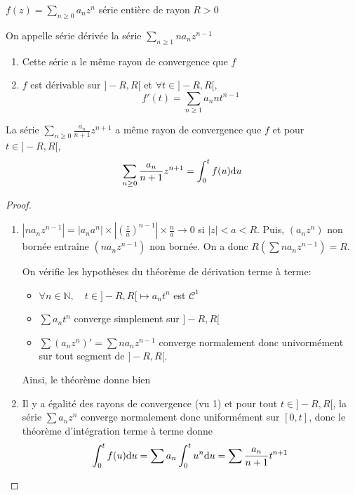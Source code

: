 \begin{thm}
    \Hyp $f(z)=\sum_{n\geq 0}a_nz^n$ série entière de rayon $R>0$
    \begin{concenum}
    \item On appelle série dérivée la série $\sum_{n\geq 1}na_nz^{n-1}$
        \begin{enumerate}
            \item Cette série a le même rayon de convergence que $f$
            \item $f$ est dérivable sur $]-R, R[$ et $\forall t\in ]-R, R[,$ \[
                    f'(t)=\sum_{n\geq 1}a_nnt^{n-1}
                \]
        \end{enumerate}
        \item La série $\sum_{n\geq 0}\frac{a_n}{n+1}z^{n+1}$ a même rayon de convergence que $f$ et pour $t\in ]-R, R[$, \[
            \sum_{n\geq 0}\frac{a_n}{n+1}z^{n+1}=\int_0^tf(u)\mathrm{d} u
            \]
    \end{concenum}
\end{thm}

\begin{proof}
    \begin{enumerate}
        \item $|na_nz^{n-1}|=|a_na^n|\times \left| (\frac za)^{n-1} \right|\times \frac na\xrightarrow{}0$ si $|z|<a<R$. Puis, $(a_nz^n)$ non bornée entraîne $(na_nz^{n-1})$ non bornée. On a donc $R(\sum na_nz^{n-1})=R$.

            On vérifie les hypothèses du théorème de dérivation terme à terme: \begin{itemize}
                \item $\forall n\in\mathbb N, \quad t\in]-R,R[\longmapsto a_nt^n$ est $\mathcal C^1$
                \item $\sum a_nt^n$ converge simplement sur $]-R, R[$
                \item $\sum(a_nz^n)'=\sum na_nz^{n-1}$ converge normalement donc univormément sur tout segment de $]-R, R[$.
            \end{itemize}
            Ainsi, le théorème donne bien \conc
        \item Il y a égalité des rayons de convergence (vu 1) et pour tout $t\in ]-R,R[$, la série $\sum a_nz^n$ converge normalement donc uniformément sur $[0,t]$, donc le théorème d'intégration terme à terme donne \[
                \int_0^tf(u)\mathrm{d} u=\sum a_n\int_0^t u^n\mathrm{d} u=\sum \frac{a_n}{n+1}t^{n+1}
            \]
    \end{enumerate}
\end{proof}

